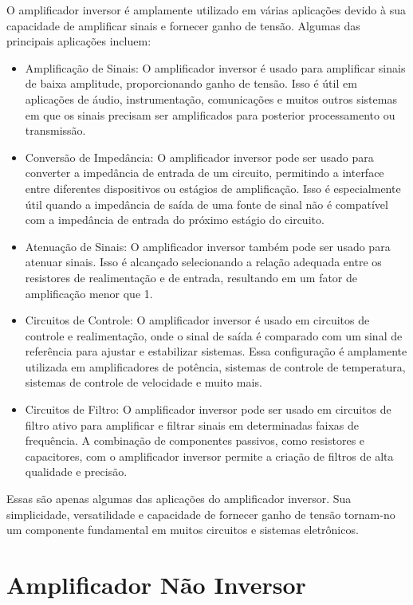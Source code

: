 \documentclass[12pt,twoside, a4paper, twocolumn]{article}
\begin{document}
O amplificador inversor é amplamente utilizado em várias aplicações devido à sua capacidade de amplificar sinais e fornecer ganho de tensão. Algumas das principais aplicações incluem:


\begin{itemize}
    \item Amplificação de Sinais: O amplificador inversor é usado para amplificar sinais de baixa amplitude, proporcionando ganho de tensão. Isso é útil em aplicações de áudio, instrumentação, comunicações e muitos outros sistemas em que os sinais precisam ser amplificados para posterior processamento ou transmissão.
    \item Conversão de Impedância: O amplificador inversor pode ser usado para converter a impedância de entrada de um circuito, permitindo a interface entre diferentes dispositivos ou estágios de amplificação. Isso é especialmente útil quando a impedância de saída de uma fonte de sinal não é compatível com a impedância de entrada do próximo estágio do circuito.
    \item Atenuação de Sinais: O amplificador inversor também pode ser usado para atenuar sinais. Isso é alcançado selecionando a relação adequada entre os resistores de realimentação e de entrada, resultando em um fator de amplificação menor que 1.
    \item Circuitos de Controle: O amplificador inversor é usado em circuitos de controle e realimentação, onde o sinal de saída é comparado com um sinal de referência para ajustar e estabilizar sistemas. Essa configuração é amplamente utilizada em amplificadores de potência, sistemas de controle de temperatura, sistemas de controle de velocidade e muito mais.
    \item Circuitos de Filtro: O amplificador inversor pode ser usado em circuitos de filtro ativo para amplificar e filtrar sinais em determinadas faixas de frequência. A combinação de componentes passivos, como resistores e capacitores, com o amplificador inversor permite a criação de filtros de alta qualidade e precisão.
\end{itemize}


Essas são apenas algumas das aplicações do amplificador inversor. Sua simplicidade, versatilidade e capacidade de fornecer ganho de tensão tornam-no um componente fundamental em muitos circuitos e sistemas eletrônicos.


\newpage
\section{Amplificador Não Inversor}
\end{document}
